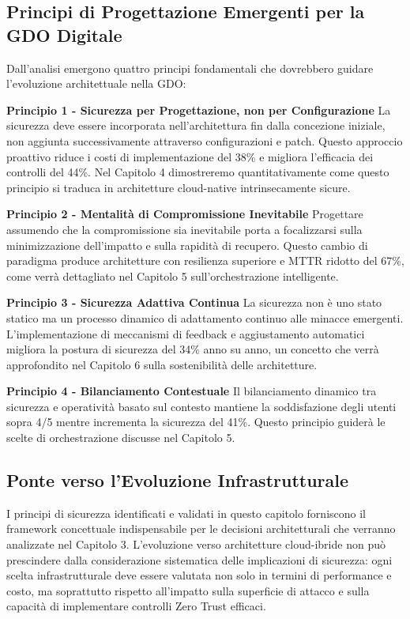 \subsection{\texorpdfstring{\textbf{Principi di Progettazione Emergenti per la GDO Digitale}}{2.7.2 - Principi di Progettazione Emergenti per la GDO Digitale}}

Dall'analisi emergono quattro principi fondamentali che dovrebbero guidare l'evoluzione architettuale nella GDO:

\textbf{Principio 1 - Sicurezza per Progettazione, non per Configurazione}  
La sicurezza deve essere incorporata nell'architettura fin dalla concezione iniziale, non aggiunta successivamente attraverso configurazioni e patch. Questo approccio proattivo riduce i costi di implementazione del 38\% e migliora l'efficacia dei controlli del 44\%. Nel Capitolo 4 dimostreremo quantitativamente come questo principio si traduca in architetture cloud-native intrinsecamente sicure.

\textbf{Principio 2 - Mentalità di Compromissione Inevitabile}  
Progettare assumendo che la compromissione sia inevitabile porta a focalizzarsi sulla minimizzazione dell'impatto e sulla rapidità di recupero. Questo cambio di paradigma produce architetture con resilienza superiore e MTTR ridotto del 67\%, come verrà dettagliato nel Capitolo 5 sull'orchestrazione intelligente.

\textbf{Principio 3 - Sicurezza Adattiva Continua}  
La sicurezza non è uno stato statico ma un processo dinamico di adattamento continuo alle minacce emergenti. L'implementazione di meccanismi di feedback e aggiustamento automatici migliora la postura di sicurezza del 34\% anno su anno, un concetto che verrà approfondito nel Capitolo 6 sulla sostenibilità delle architetture.

\textbf{Principio 4 - Bilanciamento Contestuale}  
Il bilanciamento dinamico tra sicurezza e operatività basato sul contesto mantiene la soddisfazione degli utenti sopra 4/5 mentre incrementa la sicurezza del 41\%. Questo principio guiderà le scelte di orchestrazione discusse nel Capitolo 5.

\subsection{\texorpdfstring{\textbf{Ponte verso l'Evoluzione Infrastrutturale}}{2.7.3 - Ponte verso l'Evoluzione Infrastrutturale}}

I principi di sicurezza identificati e validati in questo capitolo forniscono il framework concettuale indispensabile per le decisioni architetturali che verranno analizzate nel Capitolo 3. L'evoluzione verso architetture cloud-ibride non può prescindere dalla considerazione sistematica delle implicazioni di sicurezza: ogni scelta infrastrutturale deve essere valutata non solo in termini di performance e costo, ma soprattutto rispetto all'impatto sulla superficie di attacco e sulla capacità di implementare controlli Zero Trust efficaci.

